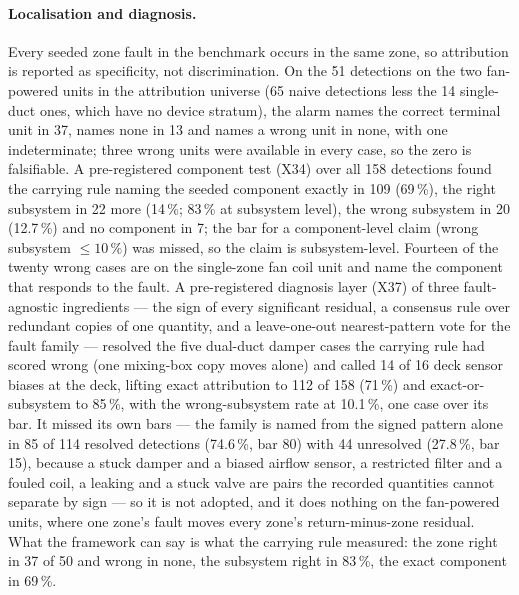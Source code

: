 \documentclass[11pt,letterpaper]{article}
\begin{document}
\paragraph{Localisation and diagnosis.} Every seeded zone fault in the benchmark occurs in the same zone, so attribution is reported as specificity, not discrimination. On the 51 detections on the two fan-powered units in the attribution universe (65 naive detections less the 14 single-duct ones, which have no device stratum), the alarm names the correct terminal unit in 37, names none in 13 and names a wrong unit in none, with one indeterminate; three wrong units were available in every case, so the zero is falsifiable. A pre-registered component test (X34) over all 158 detections found the carrying rule naming the seeded component exactly in 109 (69\,\%), the right subsystem in 22 more (14\,\%; 83\,\% at subsystem level), the wrong subsystem in 20 (12.7\,\%) and no component in 7; the bar for a component-level claim (wrong subsystem $\le 10\,\%$) was missed, so the claim is subsystem-level. Fourteen of the twenty wrong cases are on the single-zone fan coil unit and name the component that responds to the fault. A pre-registered diagnosis layer (X37) of three fault-agnostic ingredients --- the sign of every significant residual, a consensus rule over redundant copies of one quantity, and a leave-one-out nearest-pattern vote for the fault family --- resolved the five dual-duct damper cases the carrying rule had scored wrong (one mixing-box copy moves alone) and called 14 of 16 deck sensor biases at the deck, lifting exact attribution to 112 of 158 (71\,\%) and exact-or-subsystem to 85\,\%, with the wrong-subsystem rate at 10.1\,\%, one case over its bar. It missed its own bars --- the family is named from the signed pattern alone in 85 of 114 resolved detections (74.6\,\%, bar 80) with 44 unresolved (27.8\,\%, bar 15), because a stuck damper and a biased airflow sensor, a restricted filter and a fouled coil, a leaking and a stuck valve are pairs the recorded quantities cannot separate by sign --- so it is not adopted, and it does nothing on the fan-powered units, where one zone's fault moves every zone's return-minus-zone residual. What the framework can say is what the carrying rule measured: the zone right in 37 of 50 and wrong in none, the subsystem right in 83\,\%, the exact component in 69\,\%.
\end{document}
